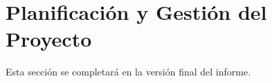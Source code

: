 \section{Planificación y Gestión del Proyecto}
\label{sec:planificacion}

Esta sección se completará en la versión final del informe.
